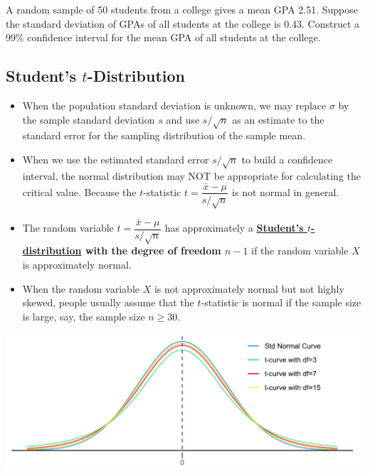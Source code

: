 \begin{example}

A random sample of 50 students from a college gives a mean GPA 2.51.
Suppose the standard deviation of GPAs of all students at the college is
0.43. Construct a 99\% confidence interval for the mean GPA of all
students at the college.

\end{example}
\vspace*{6\baselineskip}


\hypertarget{students-t-distribution}{%
\subsection{\texorpdfstring{Student's
\(t\)-Distribution}{Student's t-Distribution}}\label{students-t-distribution}}

\begin{itemize}
\item
  When the population standard deviation is unknown, we may replace
  \(\sigma\) by the sample standard deviation \(s\) and use
  \(s/\sqrt{n}\) as an estimate to the standard error for the sampling
  distribution of the sample mean.
\item
  When we use the estimated standard error \(s / \sqrt{n}\) to build a
  confidence interval, the normal distribution may NOT be
  appropriate for calculating the critical value. Because the \(t\)-statistic
  \(t=\dfrac{\bar{x}-\mu}{s / \sqrt{n}}\) is not normal in general.
\item
  The random variable \(t=\dfrac{\bar{x}-\mu}{s / \sqrt{n}}\) has approximately a
  \textbf{\href{https://en.wikipedia.org/wiki/Student\%27s_t-distribution}{Student's
  \(t\)-distribution} with the degree of freedom \(n-1\)} 
  if the random variable \(X\) is approximately normal.
\item When the random variable $X$ is not approximately normal but not highly skewed,  people usually assume that the \(t\)-statistic is normal if the sample size is large, say, 
the sample size $n\ge 30$.\end{itemize}

\includegraphics[width=\textwidth]{Figures/t-curves}

